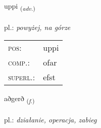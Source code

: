 \documentclass[frontgrid, backgrid]{flacards}\usepackage[]{graphicx}\usepackage[]{xcolor}
\begin{document}
\renewcommand{\flhead}{\vskip5pt \fboxsep=0pt {\small\bfseries\footnotesize Atviksorð | przysłówek}}
\renewcommand{\fcfoot}{\vskip5pt \fboxsep=0pt \hspace{2pt}{\small\bfseries\footnotesize 1K}}

\renewcommand{\blhead}{\vskip5pt {\small\bfseries\footnotesize Atviksorð | przysłówek }}
\renewcommand{\bcfoot}{\vskip5pt \hspace{2pt}{\small\bfseries\footnotesize 1K}}


{uppi \small{\textsubscript{(\textit{adv.})}} \\[1ex] %
\textphonetic{[ʏhpɪ]} \\
pl.: \emph{powyżej, na górze} \\  [2ex]
\renewcommand*{\arraystretch}{0.8}
\begin{tabular}{ll}
\textsc{pos}: & uppi \\ 
\textsc{comp.}: & ofar \\ 
\textsc{superl.}: & efst \\
\end{tabular}
}

\renewcommand{\flhead}{\vskip5pt \fboxsep=0pt {\small\bfseries\footnotesize Nafnorð | rzeczownik}}
\renewcommand{\fcfoot}{\vskip5pt \fboxsep=0pt \hspace{2pt}{\small\bfseries\footnotesize 1K}}

\renewcommand{\blhead}{\vskip5pt {\small\bfseries\footnotesize Nafnorð | rzeczownik }}
\renewcommand{\bcfoot}{\vskip5pt \hspace{2pt}{\small\bfseries\footnotesize 1K}}


{aðgerð \small{\textsubscript{(\textit{f.})}} \\[1ex] %
\textphonetic{[aðcɛrð]} \\
pl.: \emph{działanie, operacja, zabieg} \\  [2ex]
\renewcommand*{\arraystretch}{0.8}
}
\end{document}
